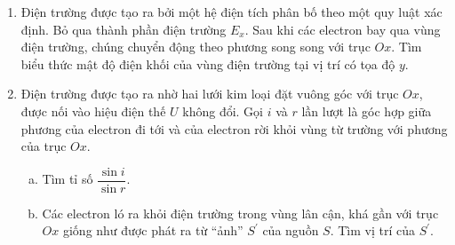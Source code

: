 \begin{vd}
\begin{center}
\end{center}

\begin{enumerate}[1)]
    \item Điện trường được tạo ra bởi một hệ điện tích phân bố theo một quy luật xác định. Bỏ qua thành phần điện trường ${E}_{{x}}$. Sau khi các electron bay qua vùng điện trường, chúng chuyển động theo phương song song với trục ${Ox}$. Tìm biểu thức mật độ điện khối của vùng điện trường tại vị trí có tọa độ ${y}$.
    \item Điện trường được tạo ra nhờ hai lưới kim loại đặt vuông góc với trục ${Ox}$, được nối vào hiệu điện thế $U$ không đổi. Gọi $i$ và $r$ lần lượt là góc hợp giữa phương của electron đi tới và của electron rời khỏi vùng từ trường với phương của trục ${Ox}$.
\begin{enumerate}[a)]
    \item Tìm tỉ số $\dfrac{\sin i}{\sin r}$.
    \item Các electron ló ra khỏi điện trường trong vùng lân cận, khá gần với trục $Ox$ giống như được phát ra từ ``ảnh'' ${S}^{\prime}$ của nguồn ${S}$. Tìm vị trí của ${S}^{\prime}$.
\end{enumerate}
\end{enumerate}
\end{vd}


